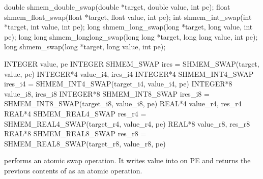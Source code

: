 \synC
 	  
double shmem_double_swap(double *target, double value, int pe);
float shmem_float_swap(float *target, float value, int pe);
int shmem_int_swap(int *target, int value, int pe);
long shmem_long_swap(long *target, long value, int pe);
long long shmem_longlong_swap(long long *target, long long value, int pe);
long shmem_swap(long *target, long value, int pe); %

\synF   %

INTEGER value, pe
INTEGER SHMEM_SWAP
ires = SHMEM_SWAP(target, value, pe) 
INTEGER*4 value_i4, ires_i4
INTEGER*4 SHMEM_INT4_SWAP
ires_i4 = SHMEM_INT4_SWAP(target_i4, value_i4, pe) 
INTEGER*8 value_i8, ires_i8
INTEGER*8 SHMEM_INT8_SWAP
ires_i8 = SHMEM_INT8_SWAP(target_i8, value_i8, pe)
REAL*4 value_r4, res_r4
REAL*4 SHMEM_REAL4_SWAP
res_r4 = SHMEM_REAL4_SWAP(target_r4, value_r4, pe) 
REAL*8 value_r8, res_r8
REAL*8 SHMEM_REAL8_SWAP
res_r8 = SHMEM_REAL8_SWAP(target_r8, value_r8, pe)%

{        performs  an atomic swap operation. It writes value  into \target{} on \ac{PE} and	returns the previous
       contents of \target{} as an atomic operation. 
}
{
\hfill \\
{
}
}
\eAPI
